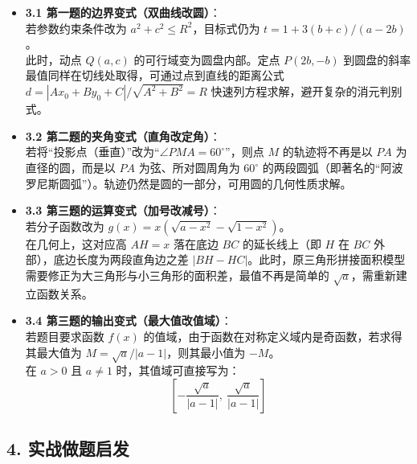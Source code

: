 \documentclass[11pt,a4paper]{ctexart}
\begin{document}
\begin{itemize}
  \item \textbf{3.1 第一题的边界变式（双曲线改圆）}：\\
        若参数约束条件改为 $a^2 + c^2 \le R^2$，目标式仍为 $t = 1 + 3(b+c)/(a-2b)$。\\
        此时，动点 $Q(a,c)$ 的可行域变为圆盘内部。定点 $P(2b,-b)$ 到圆盘的斜率最值同样在切线处取得，可通过点到直线的距离公式 $d = |A x_0 + B y_0 + C|/\sqrt{A^2+B^2} = R$ 快速列方程求解，避开复杂的消元判别式。
  \item \textbf{3.2 第二题的夹角变式（直角改定角）}：\\
        若将“投影点（垂直）”改为“$\angle PMA = 60^\circ$”，则点 $M$ 的轨迹将不再是以 $PA$ 为直径的圆，而是以 $PA$ 为弦、所对圆周角为 $60^\circ$ 的两段圆弧（即著名的“阿波罗尼斯圆弧”）。轨迹仍然是圆的一部分，可用圆的几何性质求解。
  \item \textbf{3.3 第三题的运算变式（加号改减号）}：\\
        若分子函数改为 $g(x) = x\left(\sqrt{a-x^2} - \sqrt{1-x^2}\right)$。\\
        在几何上，这对应高 $AH=x$ 落在底边 $BC$ 的延长线上（即 $H$ 在 $BC$ 外部），底边长度为两段直角边之差 $|BH - HC|$。此时，原三角形拼接面积模型需要修正为大三角形与小三角形的面积差，最值不再是简单的 $\sqrt{a}$，需重新建立函数关系。
  \item \textbf{3.4 第三题的输出变式（最大值改值域）}：\\
        若题目要求函数 $f(x)$ 的值域，由于函数在对称定义域内是奇函数，若求得其最大值为 $M = \sqrt{a}/|a-1|$，则其最小值为 $-M$。\\
        在 $a > 0$ 且 $a \ne 1$ 时，其值域可直接写为：
        $$\left[-\frac{\sqrt{a}}{|a-1|},\ \frac{\sqrt{a}}{|a-1|}\right]$$
\end{itemize}

\subsection{4. 实战做题启发}
\end{document}
